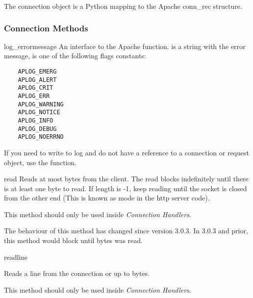 The connection object is a Python mapping to the Apache conn_rec
structure.

\subsubsection{Connection Methods\label{pyapi-mpconn-meth}}

\begin{methoddesc}[connection]{log_error}{message}
  An interface to the Apache 
  function.  is a string with the error message,
   is one of the following flags constants:

  \begin{verbatim}
    APLOG_EMERG
    APLOG_ALERT
    APLOG_CRIT
    APLOG_ERR
    APLOG_WARNING
    APLOG_NOTICE
    APLOG_INFO
    APLOG_DEBUG
    APLOG_NOERRNO
  \end{verbatim}            

  If you need to write to log and do not have a reference to a connection or
  request object, use the  function.
\end{methoddesc}

\begin{methoddesc}[connection]{read}{}
  Reads at most  bytes from the client. The read blocks
  indefinitely until there is at least one byte to read. If length is
  -1, keep reading until the socket is closed from the other end (This
  is known as  mode in the http server code).

  This method should only be used inside \emph{Connection Handlers}.

  \begin{notice}
    The behaviour of this method has changed since version 3.0.3. In
    3.0.3 and prior, this method would block until  bytes
    was read.
  \end{notice}

\end{methoddesc}

\begin{methoddesc}[connection]{readline}{}

  Reads a line from the connection or up to  bytes.

  This method should only be used inside \emph{Connection Handlers}.

\end{methoddesc}

